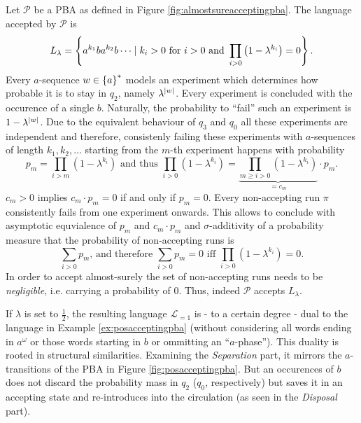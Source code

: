 \begin{example}
 \cite{DecProblemsForProbAuto}
  Let $\mathcal{P}$ be a \ac{PBA} as defined in Figure 
  \ref{fig:almostsureacceptingpba}. The language accepted by $\mathcal{P}$ is
  \begin{equation*}
    L_{\lambda} = \left\{a^{k_{1}}ba^{k_{2}}b\dots\mid k_{i}>0\text{ for }i>0
    \text{ and }\prod\limits_{i>0}\left(1-\lambda^{k_{i}}\right) = 0\right\}.
  \end{equation*}
  Every $a$-sequence $w\in\left\{a\right\}^{*}$ models an experiment which determines 
  how probable it is to stay in $q_{2}$, namely $\lambda^{\left\vert{w}\right\vert}$. Every 
  experiment is concluded with the occurence of a single $b$.  Naturally, the 
  probability to \enquote{fail} such an experiment is $1-\lambda^{\left\vert{w}\right\vert}$. 
  Due to the equivalent behaviour of $q_{3}$ and $q_{0}$ all these experiments 
  are independent and therefore, consistenly failing these experiments with 
  $a$-sequences of length $k_{1}, k_{2},\dots$ starting from the $m$-th 
  experiment happens with probability
  \begin{equation*}
    p_{m} = \prod\limits_{i>m}(1-\lambda^{k_{i}})
    \text{ and thus }
    \prod\limits_{i>0}(1-\lambda^{k_{i}}) = 
    \underbrace{\prod\limits_{m\geq i>0}(1-\lambda^{k_{i}})}_{=c_{m}}
    \cdot p_{m}.
  \end{equation*}
  $c_{m} > 0$ implies $c_{m}\cdot p_{m} = 0$ if and only if 
  $p_{m} = 0$.
  Every non-accepting run $\pi$ consistently fails from one experiment onwards.
  This allows to conclude with asymptotic equvialence of $p_{m}$ and 
  $c_{m}\cdot p_{m}$ and $\sigma$-additivity of a probability measure that the 
  probability of non-accepting runs is
  \begin{equation*}
    \sum_{i > 0} p_{m}\text{, and therefore }
    \sum_{i > 0} p_{m} = 0\text{ iff }\prod\limits_{i>0}(1-\lambda^{k_{i}}) =0.
  \end{equation*}
  In order to accept almost-surely the set of non-accepting runs needs to be
  \emph{negligible}, i.e. carrying a probability of $0$.  Thus, indeed 
  $\mathcal{P}$ accepts $L_{\lambda}$.

  If $\lambda$ is set to $\frac{1}{2}$, the resulting language 
  $\mathcal{L}_{=1}$ is - to a certain degree - dual to the language in Example 
  \ref{ex:posacceptingpba} (without considering all words ending in 
  $a^{\omega}$ or those words starting in $b$ or ommitting an 
  \enquote{$a$-phase}). This duality is rooted in structural similarities. 
  Examining the \emph{Separation} part, it mirrors the $a$-transitions of the 
  \ac{PBA} in Figure \ref{fig:posacceptingpba}. But an occurences of $b$ does 
  not discard the probability mass in $q_{2}$ ($q_0$, respectively) but saves
  it in an accepting state and re-introduces into the circulation (as seen in 
  the \emph{Disposal} part).
  \label{ex:almostsureacceptingpba}
\end{example}
